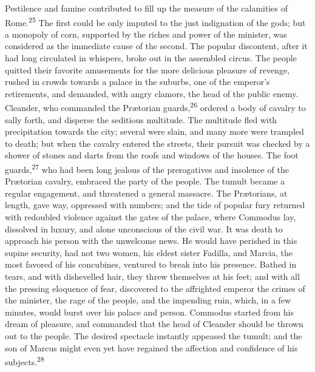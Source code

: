 Pestilence and famine contributed to fill up the measure of the
calamities of Rome.\textsuperscript{25} The first could be only imputed to the
just indignation of the gods; but a monopoly of corn, supported
by the riches and power of the minister, was considered as the
immediate cause of the second. The popular discontent, after it
had long circulated in whispers, broke out in the assembled
circus. The people quitted their favorite amusements for the more
delicious pleasure of revenge, rushed in crowds towards a palace
in the suburbs, one of the emperor’s retirements, and demanded,
with angry clamors, the head of the public enemy. Cleander, who
commanded the Prætorian guards,\textsuperscript{26} ordered a body of cavalry to
sally forth, and disperse the seditious multitude. The multitude
fled with precipitation towards the city; several were slain, and
many more were trampled to death; but when the cavalry entered
the streets, their pursuit was checked by a shower of stones and
darts from the roofs and windows of the houses. The foot guards,\textsuperscript{27}
who had been long jealous of the prerogatives and insolence of
the Prætorian cavalry, embraced the party of the people. The
tumult became a regular engagement, and threatened a general
massacre. The Prætorians, at length, gave way, oppressed with
numbers; and the tide of popular fury returned with redoubled
violence against the gates of the palace, where Commodus lay,
dissolved in luxury, and alone unconscious of the civil war. It
was death to approach his person with the unwelcome news. He
would have perished in this supine security, had not two women,
his eldest sister Fadilla, and Marcia, the most favored of his
concubines, ventured to break into his presence. Bathed in tears,
and with dishevelled hair, they threw themselves at his feet; and
with all the pressing eloquence of fear, discovered to the
affrighted emperor the crimes of the minister, the rage of the
people, and the impending ruin, which, in a few minutes, would
burst over his palace and person. Commodus started from his dream
of pleasure, and commanded that the head of Cleander should be
thrown out to the people. The desired spectacle instantly
appeased the tumult; and the son of Marcus might even yet have
regained the affection and confidence of his subjects.\textsuperscript{28}



